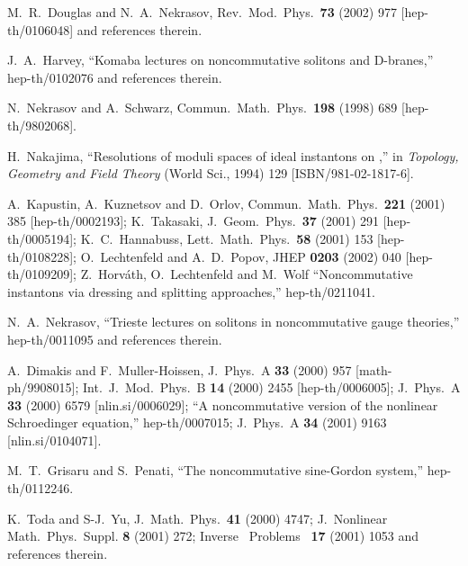 \documentclass[a4paper,12pt]{article}\setlength{\topmargin}{-1cm}
\begin{document}
\begin{thebibliography}{99}


M.~R.~Douglas and N.~A.~Nekrasov,
Rev.\ Mod.\ Phys.\  {\bf 73} (2002) 977
[hep-th/0106048]
and references therein.

J.~A.~Harvey,
``Komaba lectures on noncommutative solitons and D-branes,''
hep-th/0102076
and references therein.

N.~Nekrasov and A.~Schwarz,
Commun.\ Math.\ Phys.\ {\bf 198} (1998) 689
[hep-th/9802068].

H.~Nakajima,
``Resolutions of moduli spaces of ideal instantons on \coordHE{},''
in {\it Topology, Geometry and Field Theory}
(World Sci., 1994) 129
[ISBN/981-02-1817-6].

A.~Kapustin, A.~Kuznetsov and D.~Orlov,
Commun.\ Math.\ Phys.\  {\bf 221} (2001) 385
[hep-th/0002193];
K.~Takasaki,
J.\ Geom.\ Phys.\ {\bf 37} (2001) 291
[hep-th/0005194];
K.~C.~Hannabuss,
Lett.\ Math.\ Phys.\  {\bf 58} (2001) 153
[hep-th/0108228];
O.~Lechtenfeld and A.~D.~Popov,
JHEP {\bf 0203} (2002) 040
[hep-th/0109209];
Z.~Horv\'ath, O.~Lechtenfeld and M.~Wolf
``Noncommutative instantons via dressing and splitting approaches,''
hep-th/0211041.

N.~A.~Nekrasov,
``Trieste lectures on solitons in noncommutative gauge theories,''
hep-th/0011095
and references therein.

A.~Dimakis and F.~Muller-Hoissen,
J.\ Phys.\ A {\bf 33} (2000) 957
[math-ph/9908015];
Int.\ J.\ Mod.\ Phys.\ B {\bf 14} (2000) 2455
[hep-th/0006005];
J.\ Phys.\ A {\bf 33} (2000) 6579
[nlin.si/0006029];
``A noncommutative version of the nonlinear Schroedinger equation,''
hep-th/0007015;
J.\ Phys.\ A {\bf 34} (2001) 9163
[nlin.si/0104071].

M.~T.~Grisaru and S.~Penati,
``The noncommutative sine-Gordon system,''
hep-th/0112246.

K.~Toda and S-J.~Yu,
J.\ Math.\ Phys.\ {\bf 41} (2000) 4747;
J.\ Nonlinear Math.\ Phys.\ Suppl. {\bf 8} (2001) 272;
Inverse \ Problems \ {\bf 17} (2001) 1053 and references therein.


\end{thebibliography}
\end{document}

